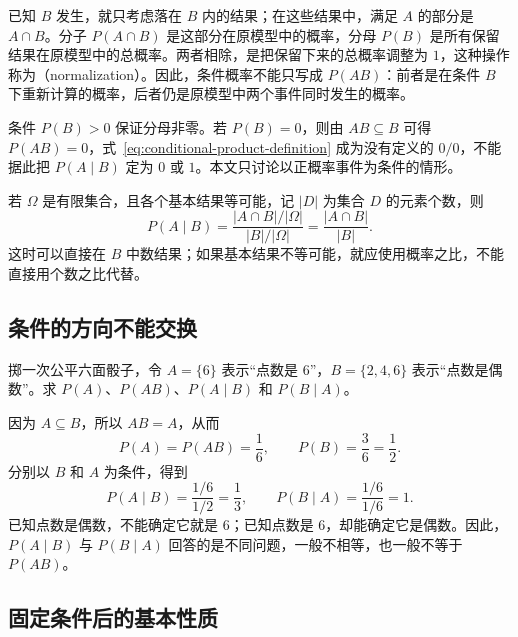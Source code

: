 \documentclass[UTF8]{ctexart}
\begin{document}
已知 $B$ 发生，就只考虑落在 $B$ 内的结果；在这些结果中，满足 $A$ 的部分是 $A\cap B$。分子 $P(A\cap B)$ 是这部分在原模型中的概率，分母 $P(B)$ 是所有保留结果在原模型中的总概率。两者相除，是把保留下来的总概率调整为 $1$，这种操作称为（normalization）。因此，条件概率不能只写成 $P(AB)$：前者是在条件 $B$ 下重新计算的概率，后者仍是原模型中两个事件同时发生的概率。

条件 $P(B)>0$ 保证分母非零。若 $P(B)=0$，则由 $AB\subseteq B$ 可得 $P(AB)=0$，式~\eqref{eq:conditional-product-definition} 成为没有定义的 $0/0$，不能据此把 $P(A\mid B)$ 定为 $0$ 或 $1$。本文只讨论以正概率事件为条件的情形。

若 $\Omega$ 是有限集合，且各个基本结果等可能，记 $|D|$ 为集合 $D$ 的元素个数，则
\begin{equation}
  P(A\mid B)
  =\frac{|A\cap B|/|\Omega|}{|B|/|\Omega|}
  =\frac{|A\cap B|}{|B|}.
  \label{eq:conditional-product-counting}
\end{equation}
这时可以直接在 $B$ 中数结果；如果基本结果不等可能，就应使用概率之比，不能直接用个数之比代替。

\subsection{条件的方向不能交换}

\begin{example}[同一对事件的两个条件概率]
\label{ex:conditional-product-die}
掷一次公平六面骰子，令 $A=\{6\}$ 表示“点数是 $6$”，$B=\{2,4,6\}$ 表示“点数是偶数”。求 $P(A)$、$P(AB)$、$P(A\mid B)$ 和 $P(B\mid A)$。
\end{example}
\begin{solve}
因为 $A\subseteq B$，所以 $AB=A$，从而
\[
  P(A)=P(AB)=\frac16,\qquad P(B)=\frac36=\frac12.
\]
分别以 $B$ 和 $A$ 为条件，得到
\[
  P(A\mid B)=\frac{1/6}{1/2}=\frac13,
  \qquad
  P(B\mid A)=\frac{1/6}{1/6}=1.
\]
已知点数是偶数，不能确定它就是 $6$；已知点数是 $6$，却能确定它是偶数。因此，$P(A\mid B)$ 与 $P(B\mid A)$ 回答的是不同问题，一般不相等，也一般不等于 $P(AB)$。
\end{solve}

\subsection{固定条件后的基本性质}
\end{document}
